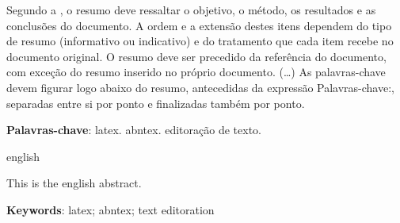 \setlength{\absparsep}{18pt} %
\begin{resumo}

 
Segundo a , o resumo deve ressaltar o objetivo, o método, os resultados e as conclusões do documento. A ordem e a extensão destes itens dependem do tipo de resumo (informativo ou indicativo) e do tratamento que cada item recebe no documento original. O resumo deve ser precedido da referência do documento, com exceção do resumo inserido no próprio documento. (\ldots) As palavras-chave devem figurar logo abaixo do resumo, antecedidas da expressão Palavras-chave:, separadas entre si por ponto e finalizadas também por ponto.

 \textbf{Palavras-chave}: latex. abntex. editoração de texto.
\end{resumo}

\begin{resumo}[Abstract]
 \begin{otherlanguage*}{english}
 	
   This is the english abstract.

   \vspace{\onelineskip}
 
   \noindent 
   \textbf{Keywords}: latex; abntex; text editoration
 \end{otherlanguage*}
\end{resumo}
